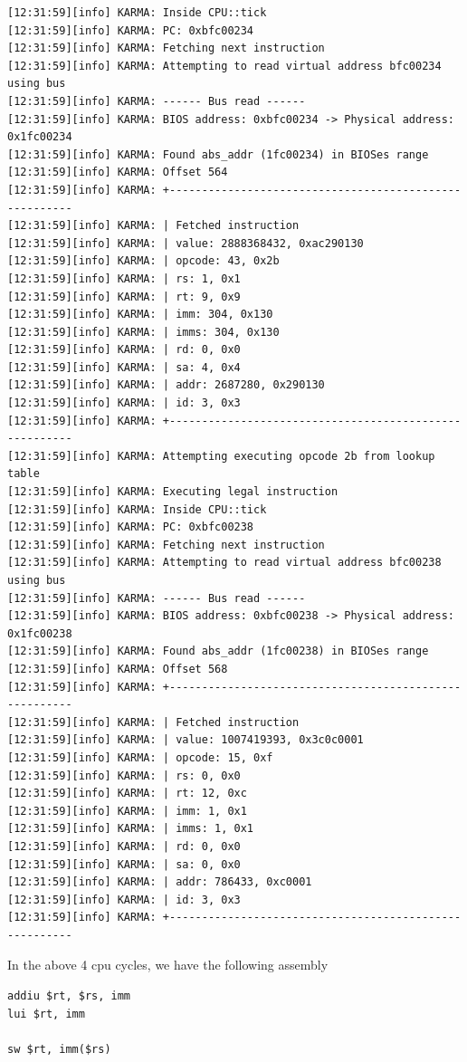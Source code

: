 \documentclass[a4paper]{article}
\begin{document}
\begin{verbatim}
[12:31:59][info] KARMA: Inside CPU::tick
[12:31:59][info] KARMA: PC: 0xbfc00234
[12:31:59][info] KARMA: Fetching next instruction
[12:31:59][info] KARMA: Attempting to read virtual address bfc00234 using bus
[12:31:59][info] KARMA: ------ Bus read ------
[12:31:59][info] KARMA: BIOS address: 0xbfc00234 -> Physical address: 0x1fc00234
[12:31:59][info] KARMA: Found abs_addr (1fc00234) in BIOSes range
[12:31:59][info] KARMA: Offset 564
[12:31:59][info] KARMA: +-------------------------------------------------------
[12:31:59][info] KARMA: | Fetched instruction 
[12:31:59][info] KARMA: | value: 2888368432, 0xac290130
[12:31:59][info] KARMA: | opcode: 43, 0x2b
[12:31:59][info] KARMA: | rs: 1, 0x1
[12:31:59][info] KARMA: | rt: 9, 0x9
[12:31:59][info] KARMA: | imm: 304, 0x130
[12:31:59][info] KARMA: | imms: 304, 0x130
[12:31:59][info] KARMA: | rd: 0, 0x0
[12:31:59][info] KARMA: | sa: 4, 0x4
[12:31:59][info] KARMA: | addr: 2687280, 0x290130
[12:31:59][info] KARMA: | id: 3, 0x3
[12:31:59][info] KARMA: +-------------------------------------------------------
[12:31:59][info] KARMA: Attempting executing opcode 2b from lookup table
[12:31:59][info] KARMA: Executing legal instruction
[12:31:59][info] KARMA: Inside CPU::tick
[12:31:59][info] KARMA: PC: 0xbfc00238
[12:31:59][info] KARMA: Fetching next instruction
[12:31:59][info] KARMA: Attempting to read virtual address bfc00238 using bus
[12:31:59][info] KARMA: ------ Bus read ------
[12:31:59][info] KARMA: BIOS address: 0xbfc00238 -> Physical address: 0x1fc00238
[12:31:59][info] KARMA: Found abs_addr (1fc00238) in BIOSes range
[12:31:59][info] KARMA: Offset 568
[12:31:59][info] KARMA: +-------------------------------------------------------
[12:31:59][info] KARMA: | Fetched instruction 
[12:31:59][info] KARMA: | value: 1007419393, 0x3c0c0001
[12:31:59][info] KARMA: | opcode: 15, 0xf
[12:31:59][info] KARMA: | rs: 0, 0x0
[12:31:59][info] KARMA: | rt: 12, 0xc
[12:31:59][info] KARMA: | imm: 1, 0x1
[12:31:59][info] KARMA: | imms: 1, 0x1
[12:31:59][info] KARMA: | rd: 0, 0x0
[12:31:59][info] KARMA: | sa: 0, 0x0
[12:31:59][info] KARMA: | addr: 786433, 0xc0001
[12:31:59][info] KARMA: | id: 3, 0x3
[12:31:59][info] KARMA: +-------------------------------------------------------
\end{verbatim}

In the above 4 cpu cycles, we have the following assembly

\begin{lstlisting}[language=assembly]
addiu $rt, $rs, imm 
lui $rt, imm

sw $rt, imm($rs)
\end{lstlisting}
\end{document}
